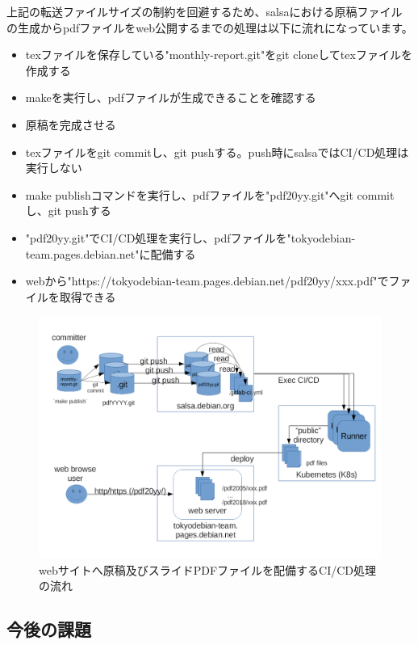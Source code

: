 \documentclass[mingoth,a4paper]{jsarticle}
\begin{document}
上記の転送ファイルサイズの制約を回避するため、salsaにおける原稿ファイルの生成からpdfファイルをweb公開するまでの処理は以下に流れになっています。


\begin{itemize}
  \item texファイルを保存している"monthly-report.git"をgit cloneしてtexファイルを作成する
  \item makeを実行し、pdfファイルが生成できることを確認する
  \item 原稿を完成させる
  \item texファイルをgit commitし、git pushする。push時にsalsaではCI/CD処理は実行しない
  \item make publishコマンドを実行し、pdfファイルを"pdf20yy.git"へgit commitし、git pushする
  \item "pdf20yy.git"でCI/CD処理を実行し、pdfファイルを"tokyodebian-team.pages.debian.net"に配備する
  \item webから"https://tokyodebian-team.pages.debian.net/pdf20yy/xxx.pdf"でファイルを取得できる
\end{itemize}


\begin{figure}[H]
\begin{center}
  \includegraphics[width=12cm]{image201806/gitflow_pdf.png}
  \caption{webサイトへ原稿及びスライドPDFファイルを配備するCI/CD処理の流れ}
  \label{fig:deploy-pdf-CICD}
\end{center}
\end{figure}


\subsection{今後の課題}
\end{document}
